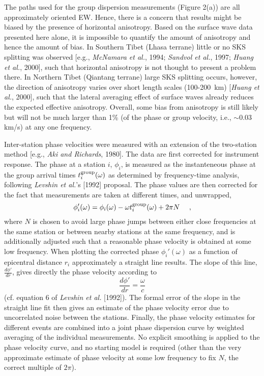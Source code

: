 \documentclass[12pt]{article}
\renewcommand{\remove}[1]{}
\begin{document}
The paths used for the group dispersion measurements (Figure 2(a)) are all
  approximately oriented EW. Hence, there is a concern that results might be
  biased by the presence of horizontal anisotropy.  Based on the surface wave
  data presented here alone, it is impossible to quantify the amount of
  anisotropy and hence the amount of bias.  In Southern Tibet (Lhasa terrane)
little or no  SKS splitting was observed [e.g., {\it McNamara et
    al.}, 1994; {\it Sandvol et    al.}, 1997; {\it Huang et    al.}, 2000],
  such that horizontal anisotropy is not thought to present a problem there.  In
  Northern Tibet (Qiantang terrane) large SKS splitting occurs, however, the direction of
  anisotropy varies over short length scales (100-200~km) [{\it Huang et
    al.}, 2000], such that the lateral averaging effect of surface waves already
  reduces the expected effective anisotropy.  Overall, some bias from anisotropy
  is still likely but will not be much larger than 1\% (of the
phase or group
velocity, i.e., $\sim$0.03 km/s) at any one frequency.

Inter-station phase velocities were measured with an extension of the two-station method [e.g., {\it Aki 
and Richards}, 1980]. The data are first corrected for instrument response\remove{ and timing errors}. The phase at 
a station $i$, $\phi_i$, is measured as the instanteneous phase at the group arrival times $t^{\rm 
group}_i(\omega)$ as determined by frequency-time analysis, following {\it Levshin et al.}'s [1992] 
proposal.  The phase values are then corrected for the fact that measurements are taken at different times, 
and unwrapped,
 \begin{displaymath} 
\phi_i'(\omega)=\phi_i(\omega)-\omega t^{\rm group}_i(\omega)+2\pi N \ \ \ \ ,
\end{displaymath} 
where $N$ is chosen to avoid large phase jumps between either close frequencies at 
the same station or between nearby stations at the same frequency, and
is additionally adjusted such that a
reasonable phase velocity is obtained at some low frequency.  When plotting the corrected phase 
$\phi_i'(\omega)$ as a function of epicentral distance $r_i$ approximately a straight line results.  The 
slope of this line, $\frac{d\phi'}{dr}$, gives directly the phase velocity according to \begin{displaymath} 
\frac{d\phi'}{dr}=\frac{\omega}{c} \end{displaymath} (cf. equation 6 of {\it Levshin et al.} [1992]). The 
formal error of the slope in the straight line fit then gives an estimate of the phase velocity error due 
to uncorrelated noise between the stations.  Finally, the phase velocity estimates for different events are 
combined into a joint phase dispersion curve by weighted averaging of the individual measurements.  No 
explicit smoothing is applied to the phase velocity curve, and no starting model is required (other than 
the very approximate estimate of phase velocity at some low frequency to fix $N$, the correct multiple of 
$2\pi$). 
\end{document}
